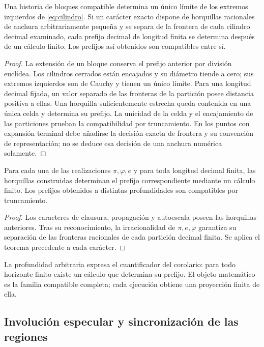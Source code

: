 \begin{theorem}
Una historia de bloques compatible determina un único límite de los extremos izquierdos de \eqref{eq:cilindro}. Si un carácter exacto dispone de horquillas racionales de anchura arbitrariamente pequeña y se separa de la frontera de cada cilindro decimal examinado, cada prefijo decimal de longitud finita se determina después de un cálculo finito. Los prefijos así obtenidos son compatibles entre sí.
\end{theorem}
\begin{proof}
La extensión de un bloque conserva el prefijo anterior por división euclídea. Los cilindros cerrados están encajados y su diámetro tiende a cero; sus extremos izquierdos son de Cauchy y tienen un único límite. Para una longitud decimal fijada, un valor separado de las fronteras de la partición posee distancia positiva a ellas. Una horquilla suficientemente estrecha queda contenida en una única celda y determina su prefijo. La unicidad de la celda y el encajamiento de las particiones prueban la compatibilidad por truncamiento. En los puntos con expansión terminal debe añadirse la decisión exacta de frontera y su convención de representación; no se deduce esa decisión de una anchura numérica solamente.
\end{proof}

\begin{corollary}
\label{gen:prefijos-regionales}
Para cada una de las realizaciones \(\pi,\varphi,e\) y para toda longitud
decimal finita, las horquillas construidas determinan el prefijo correspondiente
mediante un cálculo finito. Los prefijos obtenidos a distintas profundidades
son compatibles por truncamiento.
\end{corollary}
\begin{proof}
Los caracteres de clausura, propagación y autoescala poseen las horquillas
anteriores. Tras su reconocimiento, la irracionalidad de \(\pi,e,\varphi\)
garantiza su separación de las fronteras racionales de cada partición decimal
finita. Se aplica el teorema precedente a cada carácter.
\end{proof}
La profundidad arbitraria expresa el cuantificador del corolario: para todo
horizonte finito existe un cálculo que determina su prefijo. El objeto
matemático es la familia compatible completa; cada ejecución obtiene una
proyección finita de ella.

\subsection{Involución especular y sincronización de las regiones}

